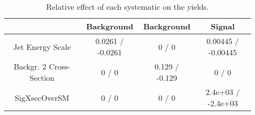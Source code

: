 \documentclass[10pt]{article}
\begin{document}
\begin{table}[htbp]
\begin{center}
\begin{tabular}{|c|c|c|c|}
\hline 
      & Background      & Background      & Signal \\ 
\hline 
  Jet Energy Scale & 0.0261 / -0.0261 & 0 / 0 & 0.00445 / -0.00445 \\ 
  Backgr. 2 Cross-Section & 0 / 0 & 0.129 / -0.129 & 0 / 0 \\ 
 SigXsecOverSM & 0 / 0 & 0 / 0 & 2.4e+03 / -2.4e+03 \\ 
\hline 
\end{tabular} 
\caption{Relative effect of each systematic on the yields.} 
\end{center} 
\end{table} 
\end{document}
